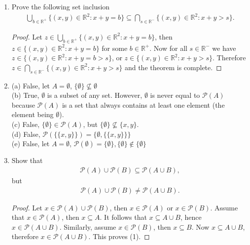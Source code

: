 \documentclass[12pt]{article}
\begin{document}
\begin{enumerate}
\begin{proof}
			Now if $y\in (-\infty,\infty)$, then for some $x\in\mathbb{R^+}$ we may have $y\in [-x,x]$. So $y\in A_x$, hence $(-\infty,\infty)\subseteq \bigcup_{x\in \mathbb{R^+}}A_x$.
			
			These two arguments combined to form the equality $\bigcup_{x\in \mathbb{R^+}}A_x=(-\infty,\infty)$.
		\end{proof}
	
		\newpage
	
		\item Prove the following set inclusion 
		\begin{align*}
			\bigcup_{b\in \mathbb{R^+}} \{(x,y)\in \mathbb{R}^2:x+y=b\} \subseteq \bigcap_{s\in \mathbb{R^-}} \{(x,y)\in \mathbb{R}^2:x+y>s \}.
		\end{align*}
		\begin{proof}
			Let $z\in \bigcup_{b\in \mathbb{R^+}} \{(x,y)\in \mathbb{R}^2:x+y=b\}$, then $z\in \{(x,y)\in \mathbb{R}^2:x+y=b\}$ for some $b\in \mathbb{R^+}$. Now for all $s\in \mathbb{R^-}$ we have $z\in \{(x,y)\in \mathbb{R}^2:x+y=b>s\}$, or $z\in \{(x,y)\in \mathbb{R}^2:x+y>s\}$. Therefore $z\in\bigcap_{s\in \mathbb{R^-}} \{(x,y)\in \mathbb{R}^2:x+y>s \}$ and the theorem is complete.
		\end{proof}
	
		\item (a) False, let $A=\emptyset$, $\{\emptyset\}\not\subseteq \emptyset$\\
		(b) True, $\emptyset$ is a subset of any set. However, $\emptyset$ is never equal to $\mathscr{P}(A)$ because $\mathscr{P}(A)$ is a set that always contains at least one element (the element being $\emptyset$).\\
		(c) False, $\{\emptyset \}\in\mathscr{P}(A)$, but $\{\emptyset \}\not\subseteq \{x,y \}$.\\
		(d) False, $\mathscr{P}(\{\{x,y \} \})=\{\emptyset, \{\{x,y \} \}\}$ \\
		(e) False, let $A=\emptyset$, $\mathscr{P}(\emptyset)=\{\emptyset \}, \{\emptyset \}\not\in\{\emptyset \}$
		
		\item Show that
		\begin{align}
			\mathscr{P}(A)\cup\mathscr{P}(B)\subseteq\mathscr{P}(A\cup B),
		\end{align}
		but
		\begin{align}
		\mathscr{P}(A)\cup\mathscr{P}(B)\not=\mathscr{P}(A\cup B).
		\end{align}
		\begin{proof}
			Let $x\in \mathscr{P}(A) \cup\mathscr{P}(B)$, then $x\in\mathscr{P}(A)$ or $x\in\mathscr{P}(B)$. Assume that $x\in\mathscr{P}(A)$, then $x\subseteq A$. It follows that $x\subseteq A\cup B$, hence $x\in\mathscr{P}(A\cup B)$. Similarly, assume $x\in\mathscr{P}(B)$, then $x\subseteq B$. Now $x\subseteq A\cup B$, therefore $x\in \mathscr{P}(A\cup B)$. This proves (1).
			

\end{proof}
\end{enumerate}
\end{document}
